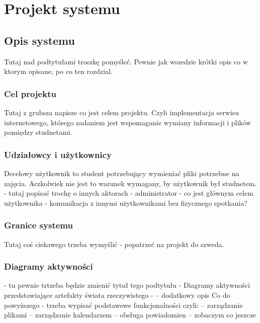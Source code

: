 \chapter{Projekt systemu}
\label{cha:projektSystemu}

\section{Opis systemu}
Tutaj nad podtytułami troszkę pomyśleć.
Pewnie jak wszedzie krótki opis co w ktorym opisane, po co ten rozdzial.
\subsection{Cel projektu}
Tutaj z grubsza napisze co jest celem projektu. Czyli implementacja serwisu internetowego, którego zadaniem jest wspomaganie wymiany informacji i plików pomiędzy studnetami.

\subsection{Udziałowcy i użytkownicy}
Decelowy użytkownik to student potrzebujący wymieniać pliki potrzebne na zajęcia. Aczkolwiek nie jest to warunek wymagany, by użytkownik był studnetem.\newline
- tutaj popisać trochę o innych aktorach - administrator \newline
- co jest głównym celem użytkownika - komunikacja z innymi użytkownikami bez fizycznego spotkania? \newline

\subsection{Granice systemu}
Tutaj coś ciekawego trzeba wymyślić - popatrzeć na projekt do szweda.

\subsection{Diagramy aktywności}
- tu pewnie trtzeba będzie zmienić tytuł tego podtytułu \newline
- Diagramy aktywności przedstawiające
artefakty świata rzeczywistego - –
dodatkowy opis  \newline
Co do powyższego - trzeba wypisać podstawowe funkcjonalności czyli: \newline
	-- zarządzanie plikami \newline
	-- zarządzanie kalendarzem \newline
	-- obsługa powiadomien \newline
	-- zobaczym co jeszcze \newline
	
